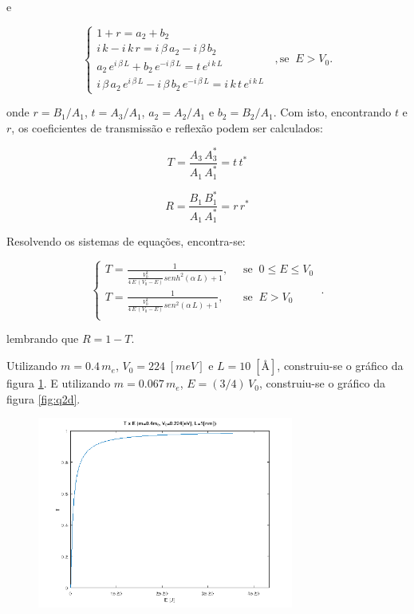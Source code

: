 \noindent e

\begin{equation}
	\begin{cases}
		1 + r = a_2 + b_2                                             \\
		i\,k - i\,k\,r = i\,\beta\,a_2 - i\,\beta\,b_2                \\
		a_2\,e^{i\,\beta\,L} + b_2\,e^{-i\,\beta\,L} = t\,e^{i\,k\,L} \\
		i\,\beta\,a_2\,e^{i\,\beta\,L} - i\,\beta\,b_2\,e^{-i\,\beta\,L} =
		i\,k\,t\,e^{i\,k\,L}
	\end{cases}\;\;, \mbox{se}\;\;E > V_0.
\end{equation}

\noindent onde $r=B_1/A_1$, $t=A_3/A_1$, $a_2=A_2/A_1$ e $b_2=B_2/A_1$. Com
isto, encontrando $t$ e $r$, os coeficientes de transmissão e reflexão podem
ser calculados:

\begin{equation}
	T=\frac{A_3\,A_3^*}{A_1\,A_1^*} = t\,t^*
\end{equation}

\begin{equation}
	R=\frac{B_1\,B_1^*}{A_1\,A_1^*} = r\,r^*
\end{equation}

Resolvendo os sistemas de equações, encontra-se:

\begin{equation}
	\begin{cases}
		T=\frac{1}{\frac{V_0^2}{4\,E\,(V_0-E)}senh^2(\alpha\,L)+1},
		 & \;\;\mbox{se}\;\;0 \le E \le V_0 \\
		T=\frac{1}{\frac{V_0^2}{4\,E\,(V_0-E)}sen^2(\alpha\,L)+1},
		 & \;\;\mbox{se}\;\;E > V_0         \\
	\end{cases}\;.
\end{equation}

\noindent lembrando que $R=1-T$.

Utilizando $m=0.4\,m_e$, $V_0=224\;[meV]$ e $L=10\;[Å]$, construiu-se o gráfico
da figura \ref{fig:q2c}. E utilizando $m=0.067\,m_e$, $E=(3/4)\,V_0$,
construiu-se o gráfico da figura \ref{fig:q2d}.

\begin{figure}[H] \centering
	\includegraphics[width=0.75\textwidth]{../images/q2c.png}
	\label{fig:q2c}
\end{figure}

